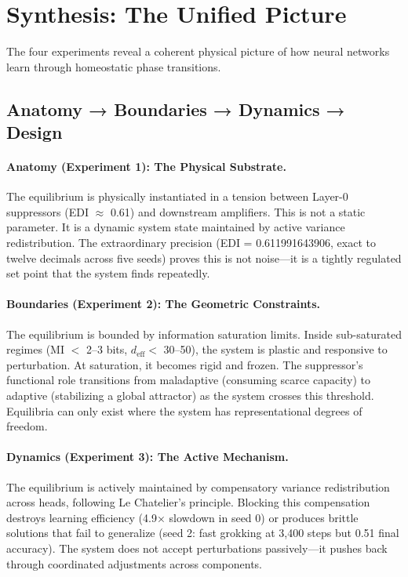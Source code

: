 \section{Synthesis: The Unified Picture}\label{sec:synthesis}

The four experiments reveal a coherent physical picture of how neural networks learn through homeostatic phase transitions.

\subsection{Anatomy → Boundaries → Dynamics → Design}

\paragraph{Anatomy (Experiment 1): The Physical Substrate.}
The equilibrium is physically instantiated in a tension between Layer-0 suppressors (EDI $\approx$ 0.61) and downstream amplifiers. This is not a static parameter. It is a dynamic system state maintained by active variance redistribution. The extraordinary precision (EDI = 0.611991643906, exact to twelve decimals across five seeds) proves this is not noise—it is a tightly regulated set point that the system finds repeatedly.

\paragraph{Boundaries (Experiment 2): The Geometric Constraints.}
The equilibrium is bounded by information saturation limits. Inside sub-saturated regimes (MI $<$ 2--3 bits, $d_{\text{eff}} <$ 30--50), the system is plastic and responsive to perturbation. At saturation, it becomes rigid and frozen. The suppressor's functional role transitions from maladaptive (consuming scarce capacity) to adaptive (stabilizing a global attractor) as the system crosses this threshold. Equilibria can only exist where the system has representational degrees of freedom.

\paragraph{Dynamics (Experiment 3): The Active Mechanism.}
The equilibrium is actively maintained by compensatory variance redistribution across heads, following Le Chatelier's principle. Blocking this compensation destroys learning efficiency (4.9× slowdown in seed 0) or produces brittle solutions that fail to generalize (seed 2: fast grokking at 3,400 steps but 0.51 final accuracy). The system does not accept perturbations passively—it pushes back through coordinated adjustments across components.

